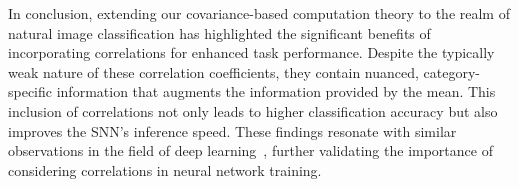 In conclusion, extending our covariance-based computation theory to the realm of natural image classification has highlighted the significant benefits of incorporating correlations for enhanced task performance. 
Despite the typically weak nature of these correlation coefficients, they contain nuanced, category-specific information that augments the information provided by the mean.
This inclusion of correlations not only leads to higher classification accuracy but also improves the SNN's inference speed. 
These findings resonate with similar observations in the field of deep learning~\cite{Wang2020, Song2022}, further validating the importance of considering correlations in neural network training.
